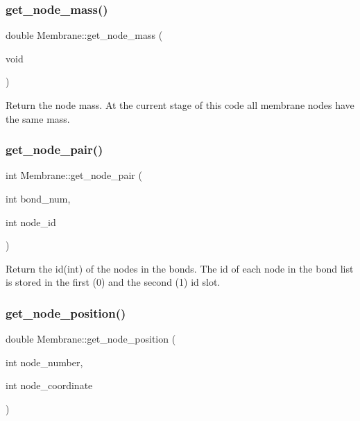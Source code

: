 \subsubsection{\texorpdfstring{get\_node\_mass()}{get\_node\_mass()}}
{\footnotesize\ttfamily double Membrane\+::get\+\_\+node\+\_\+mass (\begin{DoxyParamCaption}\item[{void}]{ }\end{DoxyParamCaption})\hspace{0.3cm}{\ttfamily [inline]}}

Return the node mass. At the current stage of this code all membrane nodes have the same mass. \mbox{\label{classMembrane_a522229db4c05a0a927c1c9ac3bf29915}} 
\subsubsection{\texorpdfstring{get\_node\_pair()}{get\_node\_pair()}}
{\footnotesize\ttfamily int Membrane\+::get\+\_\+node\+\_\+pair (\begin{DoxyParamCaption}\item[{int}]{bond\+\_\+num,  }\item[{int}]{node\+\_\+id }\end{DoxyParamCaption})\hspace{0.3cm}{\ttfamily [inline]}}

Return the id(int) of the nodes in the bonds. The id of each node in the bond list is stored in the first (0) and the second (1) id slot. \mbox{\label{classMembrane_a72b951cd255e853e51db5dcaa0bfc9d5}} 
\subsubsection{\texorpdfstring{get\_node\_position()}{get\_node\_position()}}
{\footnotesize\ttfamily double Membrane\+::get\+\_\+node\+\_\+position (\begin{DoxyParamCaption}\item[{int}]{node\+\_\+number,  }\item[{int}]{node\+\_\+coordinate }\end{DoxyParamCaption})\hspace{0.3cm}{\ttfamily [inline]}}

